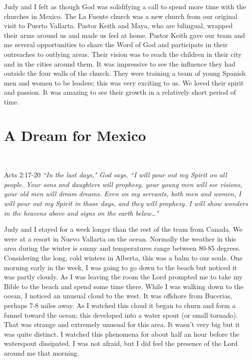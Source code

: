 \documentclass[oneside]{book}
\begin{document}
Judy and I felt as though God was solidifying a call to spend more time with the churches in Mexico. The La Fuente church was a new church from our original visit to Puerto Vallarta. Pastor Keith and Maya, who are bilingual, wrapped their arms around us and made us feel at home. Pastor Keith gave our team and me several opportunities to share the Word of God and participate in their outreaches to outlying areas. Their vision was to reach the children in their city and in the cities around them. It was impressive to see the influence they had outside the four walls of the church. They were training a team of young Spanish men and women to be leaders; this was very exciting to us. We loved their spirit and passion. It was amazing to see their growth in a relatively short period of time. 


\section{A Dream for Mexico}
\

Acts 2:17-20 \textit{``In the last days," God says, ``I will pour out my Spirit on all people. Your sons and daughters will prophesy, your young men will see visions, your old men will dream dreams. Even on my servants, both men and women, I will pour out my Spirit in those days, and they will prophesy. I will show wonders in the heavens above and signs on the earth below…"}

Judy and I stayed for a week longer than the rest of the team from Canada. We were  at a resort in Nuevo Vallarta on the ocean. Normally the weather in this area during the winter is sunny and temperatures range between 80-85 degrees. Considering the long, cold winters in Alberta, this was a balm to our souls. One morning early in the week, I was going to go down to the beach but noticed it was partly cloudy. As I was leaving the room the Lord prompted me to take my Bible to the beach and spend some time there. While I was walking down to the ocean, I noticed an unusual cloud to the west. It was offshore from Bucerias, perhaps 7-8 miles away. As I watched this cloud it began to churn and form a funnel toward the ocean; this developed into a water spout (or small tornado). That was strange and extremely unusual for this area. It wasn't very big but it was quite distinct. I watched this phenomena for about half an hour before the waterspout dissipated. I was not afraid, but I did feel the presence of the Lord around me that morning.
\end{document}
